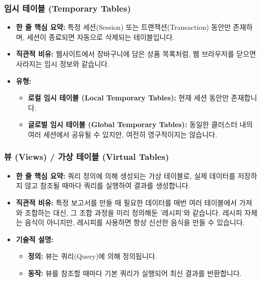 \documentclass[11pt,a4paper]{article}
\theoremstyle{definition}
\begin{document}
\subsubsection{임시 테이블 (Temporary Tables)}
\begin{itemize}
    \item \textbf{한 줄 핵심 요약:} 특정 세션(Session) 또는 트랜잭션(Transaction) 동안만 존재하며, 세션이 종료되면 자동으로 삭제되는 테이블입니다.
    \item \textbf{직관적 비유:} 웹사이트에서 장바구니에 담은 상품 목록처럼, 웹 브라우저를 닫으면 사라지는 임시 정보와 같습니다.
    \item \textbf{유형:}
    \begin{itemize}
        \item \textbf{로컬 임시 테이블 (Local Temporary Tables):} 현재 세션 동안만 존재합니다.
        \item \textbf{글로벌 임시 테이블 (Global Temporary Tables):} 동일한 클러스터 내의 여러 세션에서 공유될 수 있지만, 여전히 영구적이지는 않습니다.
    \end{itemize}
\end{itemize}

\subsubsection{뷰 (Views) / 가상 테이블 (Virtual Tables)}
\begin{itemize}
    \item \textbf{한 줄 핵심 요약:} 쿼리 정의에 의해 생성되는 가상 테이블로, 실제 데이터를 저장하지 않고 참조될 때마다 쿼리를 실행하여 결과를 생성합니다.
    \item \textbf{직관적 비유:} 특정 보고서를 만들 때 필요한 데이터를 매번 여러 테이블에서 가져와 조합하는 대신, 그 조합 과정을 미리 정의해둔 '레시피'와 같습니다. 레시피 자체는 음식이 아니지만, 레시피를 사용하면 항상 신선한 음식을 만들 수 있습니다.
    \item \textbf{기술적 설명:}
    \begin{itemize}
        \item \textbf{정의:} 뷰는 쿼리(Query)에 의해 정의됩니다.
        \item \textbf{동작:} 뷰를 참조할 때마다 기본 쿼리가 실행되어 최신 결과를 반환합니다.
    \end{itemize}
\end{itemize}
\end{document}
